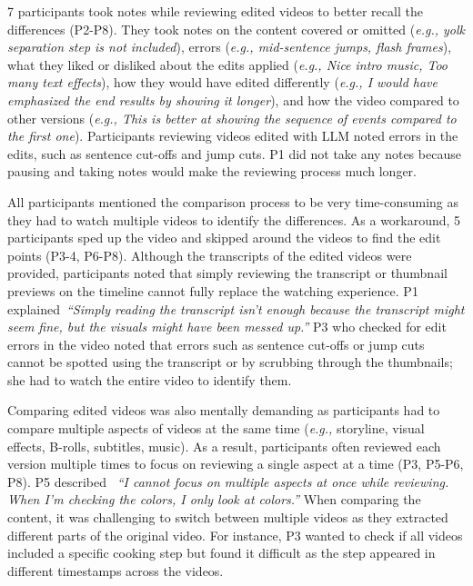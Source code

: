 7 participants took notes while reviewing edited videos to better recall the differences (P2-P8). They took notes on the content covered or omitted (\textit{e.g., yolk separation step is not included}), errors (\textit{e.g., mid-sentence jumps, flash frames}), what they liked or disliked about the edits applied (\textit{e.g., Nice intro music, Too many text effects}), how they would have edited differently (\textit{e.g., I would have emphasized the end results by showing it longer}), and how the video compared to other versions (\textit{e.g., This is better at showing the sequence of events compared to the first one}). 
Participants reviewing videos edited with LLM noted errors in the edits, such as sentence cut-offs and jump cuts.
P1 did not take any notes because pausing and taking notes would make the reviewing process much longer.

All participants mentioned the comparison process to be very time-consuming as they had to watch multiple videos to identify the differences. As a workaround, 5 participants sped up the video and skipped around the videos to find the edit points (P3-4, P6-P8).
Although the transcripts of the edited videos were provided, participants noted that simply reviewing the transcript or thumbnail previews on the timeline cannot fully replace the watching experience. P1 explained~\textit{``Simply reading the transcript isn't enough because the transcript might seem fine, but the visuals might have been messed up.''} P3 who checked for edit errors in the video noted that errors such as sentence cut-offs or jump cuts cannot be spotted using the transcript or by scrubbing through the thumbnails; she had to watch the entire video to identify them.

Comparing edited videos was also mentally demanding as participants had to compare multiple aspects of videos at the same time (\textit{e.g.,} storyline, visual effects, B-rolls, subtitles, music). 
As a result, participants often reviewed each version multiple times to focus on reviewing a single aspect at a time (P3, P5-P6, P8). P5 described ~\textit{``I cannot focus on multiple aspects at once while reviewing. When I’m checking the colors, I only look at colors.''}
When comparing the content, it was challenging to switch between multiple videos as they extracted different parts of the original video. For instance, P3 wanted to check if all videos included a specific cooking step but found it difficult as the step appeared in different timestamps across the videos. 

